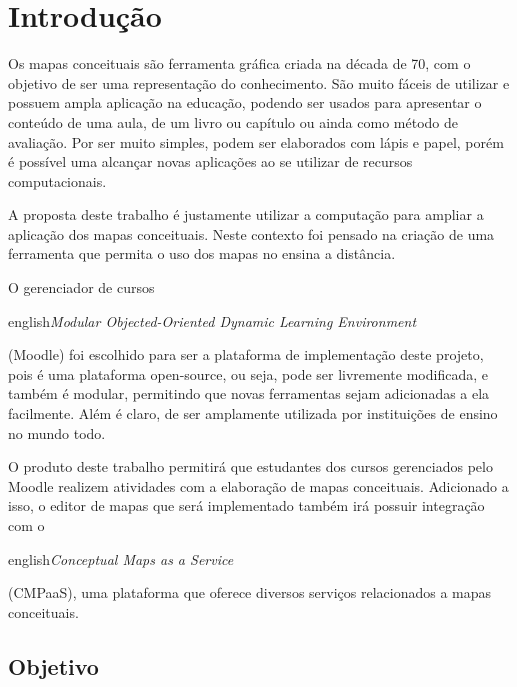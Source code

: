 \documentclass[
	12pt,				%
	openright,			%
	oneside,			%
	a4paper,			%
	english,			%
	french,				%
	spanish,			%
	brazil				%
	]{abntex2}
\begin{document}
\chapter{Introdução}

Os mapas conceituais são ferramenta gráfica criada na década de 70, com o objetivo de ser uma representação do conhecimento. São muito fáceis de utilizar e possuem ampla aplicação na educação, podendo ser usados para apresentar o conteúdo de uma aula, de um livro ou capítulo ou ainda como método de avaliação. Por ser muito simples, podem ser elaborados com lápis e papel, porém é possível uma alcançar novas aplicações ao se utilizar de recursos computacionais.

A proposta deste trabalho é justamente utilizar a computação para ampliar a aplicação dos mapas conceituais. Neste contexto foi pensado na criação de uma ferramenta que permita o uso dos mapas no ensina a distância. 

O gerenciador de cursos \begin{otherlanguage*}{english}\textit{Modular Objected-Oriented Dynamic Learning Environment}\end{otherlanguage*} (Moodle) foi escolhido para ser a plataforma de implementação deste projeto, pois é uma plataforma open-source, ou seja, pode ser livremente modificada, e também é modular, permitindo que novas ferramentas sejam adicionadas a ela facilmente. Além é claro, de ser amplamente utilizada por instituições de ensino no mundo todo.

O produto deste trabalho permitirá que estudantes dos cursos gerenciados pelo Moodle realizem atividades com a elaboração de mapas conceituais. Adicionado a isso, o editor de mapas que será implementado também irá possuir integração com o \begin{otherlanguage*}{english}\textit{Conceptual Maps as a Service}\end{otherlanguage*}  (CMPaaS), uma plataforma que oferece diversos serviços relacionados a mapas conceituais.


\section{Objetivo}
\end{document}
